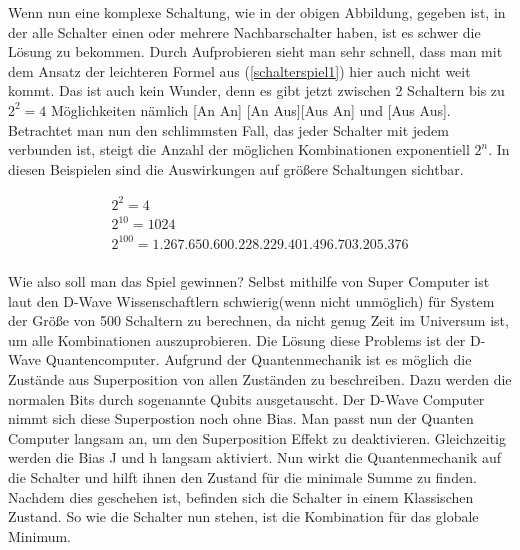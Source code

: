\documentclass{article}
\begin{document}
Wenn nun eine komplexe Schaltung, wie in der obigen Abbildung, gegeben ist,
in der alle Schalter einen oder mehrere Nachbarschalter haben, ist es schwer die Lösung zu bekommen.
Durch Aufprobieren sieht man sehr schnell, dass man mit dem Ansatz der leichteren Formel aus (\ref{schalterspiel1}) hier auch nicht weit kommt. 
Das ist auch kein Wunder, denn es gibt jetzt zwischen 2 Schaltern 
bis zu $2^2 = 4$ Möglichkeiten nämlich [An An] [An Aus][Aus An] und [Aus Aus].
Betrachtet man nun den schlimmsten Fall, das jeder Schalter mit jedem verbunden ist, steigt die Anzahl der möglichen Kombinationen exponentiell $2^n$.
\newline
\newline
In diesen Beispielen sind die Auswirkungen auf größere Schaltungen sichtbar.

\begin{align*}
2^2 = 4\\
2^{10} = 1024\\
2^{100} = 1.267.650.600.228.229.401.496.703.205.376\\
\end{align*}


\newpage

Wie also soll man das Spiel gewinnen? Selbst mithilfe von Super Computer ist
laut den D-Wave Wissenschaftlern schwierig(wenn nicht unmöglich) für System der Größe von 500 Schaltern zu berechnen, da nicht genug Zeit im Universum ist, um alle Kombinationen auszuprobieren. Die Lösung diese Problems ist der D-Wave Quantencomputer. Aufgrund der Quantenmechanik ist es möglich die Zustände aus Superposition von allen Zuständen zu beschreiben. Dazu werden die 
normalen Bits durch sogenannte Qubits ausgetauscht. Der D-Wave Computer nimmt sich diese Superpostion noch ohne Bias. Man passt nun der 
Quanten Computer langsam an, um den Superposition Effekt zu deaktivieren. Gleichzeitig werden die Bias J und h langsam aktiviert. Nun wirkt die Quantenmechanik auf die Schalter und hilft ihnen den Zustand für die minimale Summe zu finden. Nachdem dies geschehen ist, befinden sich die Schalter in einem Klassischen Zustand. So wie die Schalter nun stehen, ist die Kombination für das globale Minimum.
\end{document}
